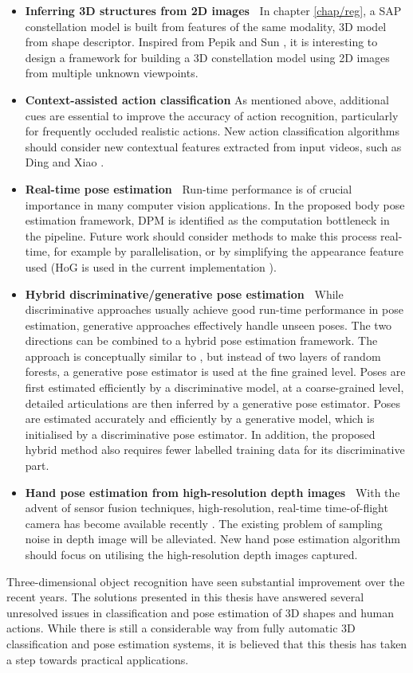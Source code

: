 \begin{itemize}
	\item \textbf{Inferring 3D structures from 2D images~} 
		In chapter \ref{chap/reg}, a SAP constellation model is built from features of the same modality, \eg 3D model from shape descriptor. Inspired from Pepik \etal \cite{Pepik2012} and Sun \etal \cite{Sun2009}, it is interesting to design a framework for building a 3D constellation model using 2D images from multiple unknown viewpoints.  
	\item \textbf{Context-assisted action classification} As mentioned above, additional cues are essential to improve the accuracy of action recognition, particularly for frequently occluded realistic actions. New action classification algorithms should consider new contextual features extracted from input videos, such as Ding and Xiao \cite{Ding2012}.   
	\item \textbf{Real-time pose estimation~} Run-time performance is of crucial importance in many computer vision applications. In the proposed body pose estimation framework, DPM is identified as the computation bottleneck in the pipeline. Future work should consider methods to make this process real-time, for example by parallelisation, or by simplifying the appearance feature used (HoG is used in the current implementation \cite{Yang2011}).  
	\item \textbf{Hybrid discriminative/generative pose estimation~} While discriminative approaches usually achieve good run-time performance in pose estimation, generative approaches effectively handle unseen poses. The two directions can be combined to a hybrid pose estimation framework. The approach is conceptually similar to \cite{Keskin2012}, but instead of two layers of random forests, a generative pose estimator is used at the fine grained level. Poses are first estimated efficiently by a discriminative model, at a coarse-grained level, detailed articulations are then inferred by a generative pose estimator. Poses are estimated accurately and efficiently by a generative model, which is initialised by a discriminative pose estimator. In addition, the proposed hybrid method also requires fewer labelled training data for its discriminative part. 
	\item \textbf{Hand pose estimation from high-resolution depth images~} With the advent of sensor fusion techniques, high-resolution, real-time time-of-flight camera has become available recently \cite{Nair2012}. The existing problem of sampling noise in depth image will be alleviated. New hand pose estimation algorithm should focus on utilising the high-resolution depth images captured.    
\end{itemize}

Three-dimensional object recognition have seen substantial improvement over the recent years.
The solutions presented in this thesis have answered several unresolved issues in classification and pose estimation of 3D shapes and human actions. While there is still a considerable way from fully automatic 3D classification and pose estimation systems, it is believed that this thesis has taken a step towards practical applications.  
